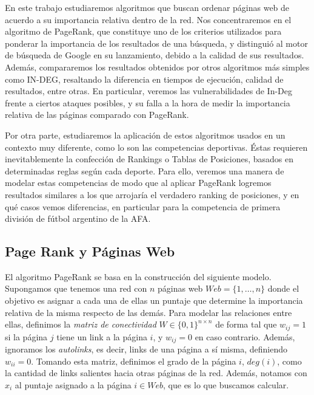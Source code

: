 \par En este trabajo estudiaremos algoritmos que buscan ordenar páginas web de acuerdo a su importancia relativa dentro de la red. Nos concentraremos en el algoritmo de PageRank, que constituye uno de los criterios utilizados para ponderar la importancia de los resultados de una búsqueda, y distinguió al motor de búsqueda de Google en su lanzamiento, debido a la calidad de sus resultados. Además, compararemos los resultados obtenidos por otros algoritmos más simples como IN-DEG, resaltando la diferencia en tiempos de ejecución, calidad de resultados, entre otras.
En particular, veremos las vulnerabilidades de In-Deg frente a ciertos ataques posibles, y su falla a la hora de medir la importancia relativa de las p\'aginas comparado con PageRank.

\par Por otra parte, estudiaremos la aplicación de estos algoritmos usados en un contexto muy diferente, como lo son las competencias deportivas. Éstas requieren inevitablemente la confección de Rankings o Tablas de Posiciones, basados en determinadas reglas según cada deporte. Para ello, veremos una manera de modelar estas competencias de modo que al aplicar PageRank logremos resultados similares a los que arrojaría el verdadero ranking de posiciones, y en qué casos vemos diferencias, en particular para la competencia de primera división de fútbol argentino de la AFA.

\subsection{Page Rank y Páginas Web}

\par El algoritmo PageRank se basa en la construcci\'on del siguiente modelo. Supongamos que tenemos una red con $n$ p\'aginas 
web $Web = \{1,\dots,n\}$ donde
el objetivo es asignar a cada una de ellas un puntaje que determine la importancia relativa de la misma respecto de las
dem\'as. Para modelar las relaciones entre ellas, definimos la \emph{matriz de conectividad} $W \in \{0,1\}^{n \times n}$ 
de forma tal que $w_{ij} = 1$ si la p\'agina $j$ tiene un link a la p\'agina $i$, y $w_{ij} = 0$ en caso contrario. 
Adem\'as, ignoramos los \emph{autolinks}, es decir, links de una p\'agina a s\'i misma, definiendo $w_{ii} = 0$. Tomando 
esta matriz, definimos el grado de la p\'agina $i$, $deg(i)$, como la cantidad de links salientes hacia otras p\'aginas 
de la red. Adem\'as, notamos con $x_i$ al puntaje asignado a la p\'agina $i\in
Web$, que es lo que buscamos calcular.

